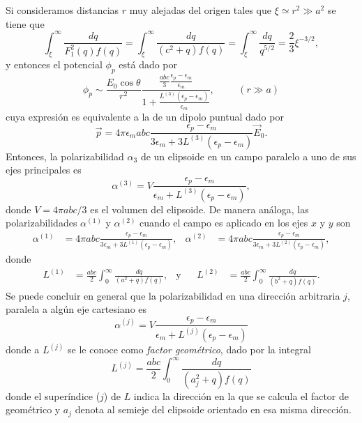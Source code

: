 Si consideramos distancias $r$ muy alejadas del origen tales que $\xi\simeq r^2\gg a^2$ se tiene que
\begin{equation*}
    \int_{\xi}^{\infty}\frac{dq}{F_1^2(q)f(q)}= \int_{\xi}^{\infty}\frac{dq}{(c^2+q)f(q)}=\int_{\xi}^{\infty}\frac{dq}{q^{5/2}}=\frac{2}{3}\xi^{-3/2},
\end{equation*}
y entonces el potencial $\phi_p$ está dado por
\begin{equation}
    \phi_p\sim\frac{E_0\cos\theta}{r^2}\frac{\frac{abc}{3}\frac{\epsilon_p-\epsilon_m}{\epsilon_m}}{1+\frac{L^{(3)}(\epsilon_p-\epsilon_m)}{\epsilon_m}},\hspace{1cm}(r\gg a)
\end{equation}
cuya expresión es equivalente a la de un dipolo puntual dado por
\begin{equation}
    \Vec{p}=4\pi\epsilon_m abc\frac{\epsilon_p-\epsilon_m}{3\epsilon_m+3L^{(3)}(\epsilon_p-\epsilon_m)}\Vec{E}_0
    \label{momento_dip}.
\end{equation}
Entonces, la polarizabilidad $\alpha_3$ de un elipsoide en un campo paralelo a uno de sus ejes principales es
\begin{equation}
    \alpha^{(3)}=V\frac{\epsilon_p-\epsilon_m}{\epsilon_m+L^{(3)}(\epsilon_p-\epsilon_m)},
\end{equation}
donde $V=4\pi abc/3$ es el volumen del elipsoide. De manera análoga, las polarizabilidades $ \alpha^{(1)}$ y $ \alpha^{(2)}$ cuando el campo es aplicado en los ejes $x$ y $y$ son
\begin{align*}
    \alpha^{(1)}&=4\pi abc \frac{\epsilon_p-\epsilon_m}{3\epsilon_m+3L^{(1)}(\epsilon_p-\epsilon_m)},&
    \alpha^{(2)}&=4\pi abc \frac{\epsilon_p-\epsilon_m}{3\epsilon_m+3L^{(2)}(\epsilon_p-\epsilon_m)},
\end{align*}
donde 
\begin{align*}
    L^{(1)}&=\frac{abc}{2}\int_{0}^{\infty}\frac{dq}{(a^2+q)f(q)},&\text{y} && 
    L^{(2)}&=\frac{abc}{2}\int_{0}^{\infty}\frac{dq}{(b^2+q)f(q)}.
\end{align*}
Se puede concluir en general que la polarizabilidad en una dirección arbitraria $j$, paralela a algún eje cartesiano es
\begin{equation}
    \alpha^{(j)}=V\frac{\epsilon_p-\epsilon_m}{\epsilon_m+L^{(j)}(\epsilon_p-\epsilon_m)}
\end{equation}
donde a $L^{(j)}$ se le conoce como \textit{factor geométrico}, dado por la integral 
\begin{equation}
    L^{(j)}=\frac{abc}{2}\int_0^{\infty}\frac{dq}{(a_j^2+q)f(q)}
\end{equation}
donde el superíndice ($j$) de $L$ indica la dirección en la que se calcula el factor de geométrico y $a_j$ denota al semieje del elipsoide orientado en esa misma dirección.\\ 

